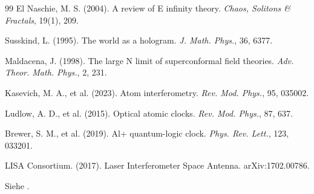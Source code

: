 \begin{thebibliography}{99}
		El Naschie, M. S. (2004). A review of E infinity theory. \emph{Chaos, Solitons \& Fractals}, 19(1), 209.
		
		Susskind, L. (1995). The world as a hologram. \emph{J. Math. Phys.}, 36, 6377.
		
		Maldacena, J. (1998). The large N limit of superconformal field theories. \emph{Adv. Theor. Math. Phys.}, 2, 231.
		
		Kasevich, M. A., et al. (2023). Atom interferometry. \emph{Rev. Mod. Phys.}, 95, 035002.
		
		Ludlow, A. D., et al. (2015). Optical atomic clocks. \emph{Rev. Mod. Phys.}, 87, 637.
		
		Brewer, S. M., et al. (2019). Al+ quantum-logic clock. \emph{Phys. Rev. Lett.}, 123, 033201.
		
		LISA Consortium. (2017). Laser Interferometer Space Antenna. arXiv:1702.00786.
		
		Siehe \cite{hundert1931}.
		
	\end{thebibliography}